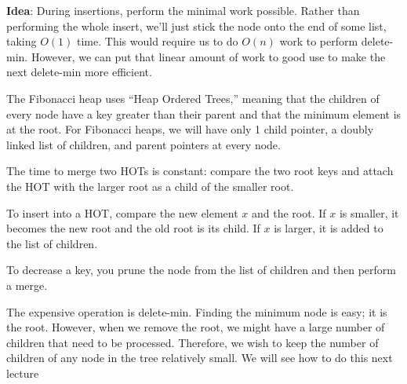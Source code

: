 \documentclass{article}
\begin{document}
\textbf{Idea}: During insertions, perform the minimal work possible.
Rather than performing the whole insert, we'll just stick the node
onto the end of some list, taking $O(1)$ time.  This would require us
to do $O(n)$ work to perform delete-min.  However, we can put that
linear amount of work to good use to make the next delete-min more
efficient.

The Fibonacci heap uses ``Heap Ordered Trees,'' meaning that the
children of every node have a key greater than their parent and that
the minimum element is at the root.  For Fibonacci heaps, we will have
only 1 child pointer, a doubly linked list of children, and parent
pointers at every node.

The time to merge two HOTs is constant: compare the two root
keys and attach the HOT with the larger root as a child of the smaller
root.  

To insert into a HOT, compare the new element $x$ and the root.  If
$x$ is smaller, it becomes the new root and the old root is its child.
If $x$ is larger, it is added to the list of children.

To decrease a key, you prune the node from the list of children and
then perform a merge.

The expensive operation is delete-min.  Finding the minimum node is
easy; it is the root.  However, when we remove the root, we might have
a large number of children that need to be processed.  Therefore, we
wish to keep the number of children of any node in the tree relatively
small.  We will see how to do this next lecture
\end{document}
